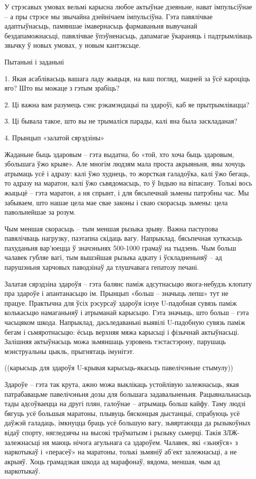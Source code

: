У стрэсавых умовах вельмі карысна любое актыўнае дзеяньне, нават імпульсіўнае – а пры стрэсе мы звычайна дзейнічаем імпульсіўна. Гэта павялічвае адаптыўнасьць, памяншае імавернасьць фармаваньня вывучанай бездапаможнасьці, павялічвае ўпэўненасьць, дапамагае ўкараняць і падтрымліваць звычку ў новых умовах, у новым кантэксьце.

Пытаньні і заданьні

1. Якая асаблівасьць вашага ладу жыцьця, на ваш погляд, мацней за ўсё кароціць яго? Што вы можаце з гэтым зрабіць?

2. Ці важна вам разумець сэнс рэкамэндацыі па здароўі, каб яе прытрымлівацца?

3. Ці бывала такое, што вы не трымаліся парады, калі яна была заскладаная?


4. Прынцып «залатой сярэдзіны»

Жаданьне быць здаровым – гэта выдатна, бо «той, хто хоча быць здаровым, збольшага ўжо крыяе». Але многім людзям мала проста акрыяньня, яны хочуць атрымаць усё і адразу: калі ўжо худнець, то жорсткая галадоўка, калі ўжо бегаць, то адразу на маратон, калі ўжо сьвядомасьць, то ў Індыю на віпасану. Толькі вось жыцьцё – гэта маратон, а ня спрынт, і для бясьпечнай зьмены патрэбны час. Мы забываем, што нашае цела мае свае законы і сваю скорасьць зьмены: цела павольнейшае за розум.

Чым меншая скорасьць – тым меншая рызыка зрыву. Важна паступова павялічваць нагрузку, паэтапна скідаць вагу. Напрыклад, бясьпечная хуткасьць пахуданьня вар'юецца ў значэньнях 500-1000 грамаў на тыдзень. Чым больш чалавек губляе вагі, тым вышэйшая рызыка адкату і ўскладненьняў – ад парушэньня харчовых паводзінаў да тлушчавага гепатозу печані.

Залатая сярэдзіна здароўя – гэта балянс паміж адсутнасьцю якога-небудзь клопату пра здароўе і апантанасьцю ім. Прынцып «больш – значыць лепш» тут не працуе. Практычна для ўсіх рэсурсаў здароўя існуе U-падобная сувязь паміж колькасьцю намаганьняў і атрыманай карысьцю. Гэта значыць, што больш – гэта часьцяком шкода. Напрыклад, дасьледаваньні выявілі U-падобную сувязь паміж бегам і сьмяротнасьцю: ёсьць верхняя мяжа карысьці і фізычнай актыўнасьці. Залішняя актыўнасьць можа зьмяншаць узровень тэстастэрону, парушаць мэнструальны цыкль, прыгнятаць імунітэт.

((карысьць для здароўя U-крывая карысьць-якасьць павелічэньне стымулу))

Здароўе – гэта так крута, ажно можа выклікаць устойлівую залежнасьць, якая патрабавацьме павелічэньня дозы для большага задавальненьня. Рацыянальнасьць тады адсоўваецца на другі плян, галоўнае – атрымаць больш кайфу. Таму людзі бягуць усё большыя маратоны, плывуць бясконцыя дыстанцыі, спрабуюць усё даўжэй галадаць, імкнуцца браць усё большую вагу, зьвяртаюцца да рызыкоўных відаў спорту, нягледзячы на высокі траўматызм і рызыку сьмерці. Такія ЗЛЖ-залежнасьці ня маюць нічога агульнага са здароўем. Чалавек, які «зьняўся» з наркотыкаў і «перасеў» на маратоны, толькі зьмяніў аб'ект залежнасьці, а не акрыяў. Хоць грамадзкая шкода ад марафонаў, вядома, меншая, чым ад наркотыкаў.

